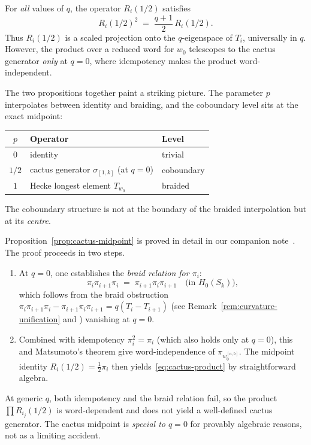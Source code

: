 \begin{proposition}
\label{prop:universal-proj}
For \emph{all} values of $q$, the operator $R_i(1/2)$ satisfies
\[
  R_i(1/2)^2 \;=\; \frac{q+1}{2}\, R_i(1/2).
\]
Thus $R_i(1/2)$ is a scaled projection onto the $q$-eigenspace of
$T_i$, universally in $q$.  However, the product over a reduced word
for $w_0$ telescopes to the cactus generator \emph{only} at $q = 0$,
where idempotency makes the product word-independent.
\end{proposition}

\noindent
The two propositions together paint a striking picture.  The parameter
$p$ interpolates between identity and braiding, and the coboundary
level sits at the exact midpoint:
\begin{center}
\renewcommand{\arraystretch}{1.3}
\begin{tabular}{cll}
\toprule
$p$ & \textbf{Operator} & \textbf{Level} \\
\midrule
$0$ & identity & trivial \\
$1/2$ & cactus generator $\sigma_{[1,k]}$ (at $q=0$) & coboundary \\
$1$ & Hecke longest element $T_{w_0}$ & braided \\
\bottomrule
\end{tabular}
\end{center}

\noindent
The coboundary structure is not at the boundary of the braided
interpolation but at its \emph{centre}.

\begin{remark}
\label{rem:midpoint-proof}
Proposition~\ref{prop:cactus-midpoint} is proved in detail in our companion
note~\cite{clio-midpoint-2026}.  The proof proceeds in two steps.
\begin{enumerate}
\item At $q = 0$, one establishes the \emph{braid relation for $\pi_i$}:
\[
  \pi_i \pi_{i+1} \pi_i \;=\; \pi_{i+1} \pi_i \pi_{i+1} \quad \text{(in $H_0(S_k)$)},
\]
which follows from the braid obstruction
$\pi_i \pi_{i+1} \pi_i - \pi_{i+1} \pi_i \pi_{i+1} = q(T_i - T_{i+1})$
(see Remark~\ref{rem:curvature-unification} and \cite{clio-midpoint-2026})
vanishing at $q = 0$.
\item Combined with idempotency $\pi_i^2 = \pi_i$ (which also holds only at $q = 0$),
this and Matsumoto's theorem give word-independence of $\pi_{w_0^{[a,b]}}$.
The midpoint identity $R_i(1/2) = \frac{1}{2}\pi_i$ then yields~\eqref{eq:cactus-product}
by straightforward algebra.
\end{enumerate}
At generic $q$, both idempotency and the braid relation fail, so the product
$\prod R_{i_j}(1/2)$ is word-dependent and does not yield a well-defined cactus
generator.  The cactus midpoint is \emph{special to $q = 0$} for provably algebraic
reasons, not as a limiting accident.
\end{remark}


